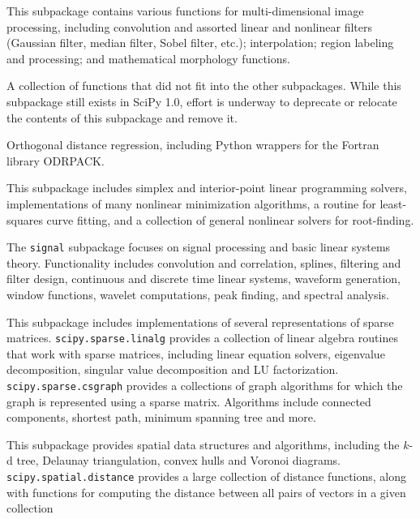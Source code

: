 \documentclass[fleqn,10pt]{wlscirep}
\begin{document}
\begin{description}[leftmargin=!, labelwidth=\widthof{\bfseries \texttt{interpolate}}]
\item[\texttt{ndimage}]
    This subpackage contains various functions for multi-dimensional image
    processing, including convolution and assorted linear and nonlinear
    filters (Gaussian filter, median filter, Sobel filter, etc.);
    interpolation; region labeling and processing; and mathematical morphology
    functions.
\item[\texttt{misc}]
    A collection of functions that did not fit into the other subpackages.
    While this subpackage still exists in SciPy 1.0, effort is underway
    to deprecate or relocate the contents of this subpackage and remove it.
\item[\texttt{odr}]
    Orthogonal distance regression, including Python wrappers for the Fortran
    library ODRPACK\cite{ODRPACK_Boggs}.
\item[\texttt{optimize}]
		This subpackage includes simplex and interior-point linear programming
		solvers, implementations of many nonlinear minimization algorithms,
		a routine for least-squares curve fitting, and 
		a collection of general nonlinear solvers for root-finding.
\item[\texttt{signal}]
    The \texttt{signal} subpackage focuses on signal processing and
    basic linear systems theory.  Functionality includes
    convolution and correlation, splines, filtering and filter design,
    continuous and discrete time linear systems, waveform generation,
    window functions, wavelet computations, peak finding, and spectral
    analysis.  
\item[\texttt{sparse}]
    This subpackage includes implementations of several representations of
    sparse matrices.\newline 
		\texttt{scipy.sparse.linalg} provides a collection of linear algebra routines that work with
		sparse matrices, including linear equation solvers, eigenvalue decomposition, singular value
		decomposition and LU factorization.
    \texttt{scipy.sparse.csgraph} provides a collections of graph algorithms
    for which the graph is represented using a sparse matrix.  Algorithms
    include connected components, shortest path, minimum spanning tree
    and more.
\item[\texttt{spatial}]
    This subpackage provides spatial data structures and algorithms,
    including the $k$-d tree, Delaunay triangulation, convex hulls and Voronoi
    diagrams. \texttt{scipy.spatial.distance} provides
    a large collection of distance functions, along with functions for
    computing the distance between all pairs of vectors in a given collection

\end{description}
\end{document}
